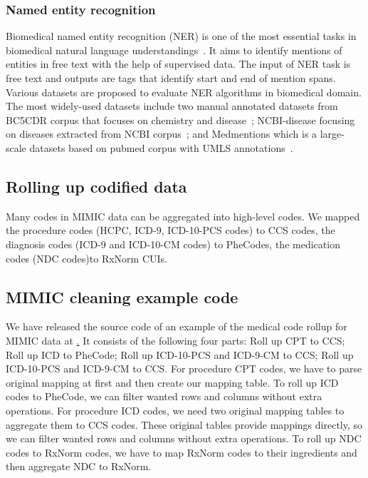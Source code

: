 \subsubsection{Named entity recognition}

Biomedical named entity recognition (NER) is one of the most essential tasks in biomedical natural language understandings~\cite{gu2021domain}. It aims to identify mentions of entities in free text with the help of supervised data. The input of NER task is free text and outputs are tags that identify start and end of mention spans. Various datasets are proposed to evaluate NER algorithms in biomedical domain. The most widely-used datasets include two manual annotated datasets from BC5CDR corpus that focuses on chemistry and disease~\cite{li2016biocreative}; NCBI-disease focusing on diseases extracted from NCBI corpus~\cite{dougan2014ncbi}; and Medmentions which is a large-scale datasets based on pubmed corpus with UMLS annotations~\cite{mohan2019medmentions}.


\subsection{Rolling up codified data}

Many codes in MIMIC data can be aggregated into high-level codes. We mapped the procedure codes (HCPC, ICD-9, ICD-10-PCS codes) to CCS codes, the diagnosis codes (ICD-9 and ICD-10-CM codes) to PheCodes, the medication codes (NDC codes)to RxNorm CUIs.




\subsection{MIMIC cleaning example code}


We have released the source code of an example of the medical code rollup for MIMIC data at \href{}. It consists of the following four parts: Roll up CPT to CCS; Roll up ICD to PheCode; Roll up ICD-10-PCS and ICD-9-CM to CCS; Roll up ICD-10-PCS and ICD-9-CM to CCS. For procedure CPT codes, we have to parse original mapping at first and then create our mapping table. To roll up ICD codes to PheCode, we can filter wanted rows and columns without extra operations. For procedure ICD codes, we need two original mapping tables to aggregate them to CCS codes. These original tables provide mappings directly, so we can filter wanted rows and columns without extra operations. To roll up NDC codes to RxNorm codes, we have to map RxNorm codes to their ingredients and then aggregate NDC to RxNorm.

